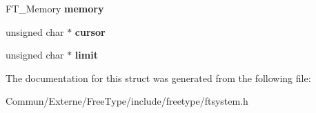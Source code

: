 \begin{DoxyCompactItemize}
\item 
F\+T\+\_\+\+Memory {\bfseries memory}\hypertarget{struct_f_t___stream_rec___a51e2be0d80d70b532aae3face5461e7e}{}\label{struct_f_t___stream_rec___a51e2be0d80d70b532aae3face5461e7e}

\item 
unsigned char $\ast$ {\bfseries cursor}\hypertarget{struct_f_t___stream_rec___ab7dbbad87d8b6d0178771a06e1ce8b4d}{}\label{struct_f_t___stream_rec___ab7dbbad87d8b6d0178771a06e1ce8b4d}

\item 
unsigned char $\ast$ {\bfseries limit}\hypertarget{struct_f_t___stream_rec___aff006e6ee3bbc2741a2c4ae79b1bad3a}{}\label{struct_f_t___stream_rec___aff006e6ee3bbc2741a2c4ae79b1bad3a}

\end{DoxyCompactItemize}


The documentation for this struct was generated from the following file\+:\begin{DoxyCompactItemize}
\item 
Commun/\+Externe/\+Free\+Type/include/freetype/ftsystem.\+h\end{DoxyCompactItemize}
